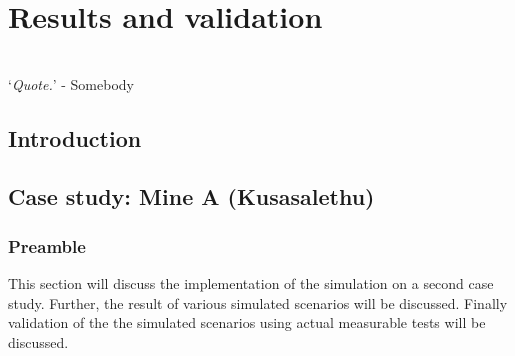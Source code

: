 \chapter{Results and validation}
\thispagestyle{empty}
\vspace{38em}
\hrulefill
\\
\enquote*{\textit{Quote.}} - Somebody\\
\newpage
\section{Introduction}
\section{Case study: Mine A \color{blue}(Kusasalethu)}
	\subsection{Preamble}
	 This section will discuss the implementation of the simulation on a second case study. Further, the result of various simulated scenarios will be discussed. Finally validation of the the simulated scenarios using actual measurable tests will be discussed.
